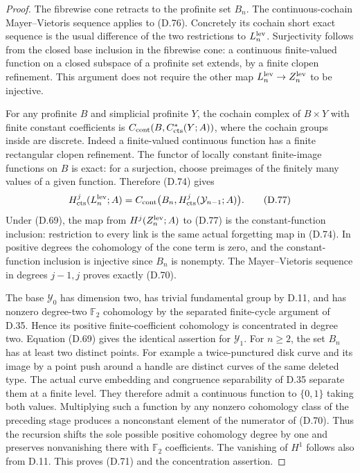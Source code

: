 \begin{proof}
The fibrewise cone retracts to the profinite set $B_n$.
The continuous-cochain Mayer--Vietoris sequence applies to
(D.76).  Concretely its cochain short exact sequence is the
usual difference of the two restrictions to $L_n^{\rm lev}$.
Surjectivity follows from the closed base inclusion in the
fibrewise cone: a continuous finite-valued function on a
closed subspace of a profinite set extends, by a finite clopen
refinement.  This argument does not require the other map
$L_n^{\rm lev}\to Z_n^{\rm lev}$ to be injective.

For any profinite $B$ and simplicial profinite $Y$, the
cochain complex of $B\times Y$ with finite constant
coefficients is $C_{\rm cont}(B,C^*_{\rm cts}(Y;A))$,
where the cochain groups inside are discrete.  Indeed a
finite-valued continuous function has a finite rectangular
clopen refinement.  The functor of locally constant
finite-image functions on $B$ is exact: for a surjection,
choose preimages of the finitely many values of a given
function.  Therefore (D.74) gives
\[
 H^j_{\rm cts}(L_n^{\rm lev};A)
  =C_{\rm cont}\bigl(B_n,
                     H^j_{\rm cts}(\mathcal Y_{n-1};A)\bigr).
                                                               \tag{D.77}
\]
Under (D.69), the map from $H^j(Z_n^{\rm lev};A)$ to (D.77)
is the constant-function inclusion: restriction to every
link is the same actual forgetting map in (D.74).  In
positive degrees the cohomology of the cone term is zero,
and the constant-function inclusion is injective since
$B_n$ is nonempty.  The Mayer--Vietoris sequence in degrees
$j-1,j$ proves exactly (D.70).

The base $\mathcal Y_0$ has dimension two, has trivial
fundamental group by D.11, and has nonzero degree-two
$\mathbb F_2$ cohomology by the separated finite-cycle
argument of D.35.  Hence its positive finite-coefficient
cohomology is concentrated in degree two.  Equation (D.69)
gives the identical assertion for $\mathcal Y_1$.
For $n\geq2$, the set $B_n$ has at least two distinct points.
For example a twice-punctured disk curve and its image by
a point push around a handle are distinct curves of the
same deleted type.  The actual curve embedding and
congruence separability of D.35 separate them at a finite
level.  They therefore admit a continuous function to
$\{0,1\}$ taking both values.  Multiplying such a function
by any nonzero cohomology class of the preceding stage
produces a nonconstant element of the numerator of
(D.70).  Thus the recursion shifts the sole possible
positive cohomology degree by one and preserves
nonvanishing there with $\mathbb F_2$ coefficients.
The vanishing of $H^1$ follows also from D.11.
This proves (D.71) and the concentration assertion.


\end{proof}
